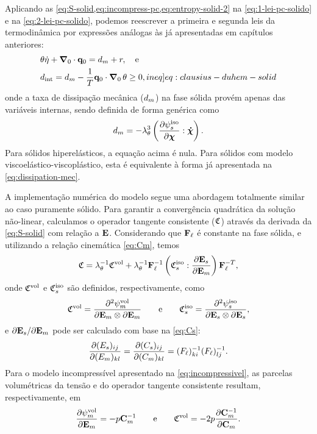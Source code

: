 \documentclass[Tese.tex]{subfiles}
\begin{document}
Aplicando as \cref{eq:S-solid,eq:incompress-pc,eq:entropy-solid-2} na \cref{eq:1-lei-pc-solido} e na \cref{eq:2-lei-pc-solido}, podemos reescrever a primeira e segunda leis da termodinâmica por expressões análogas às já apresentadas em capítulos anteriores:
\begin{align} 
&\temp \dotentropy + \gradientei\cdot\qi = \dissipationmec + \calorInt, \text{\quad e}\label{eq:primeira-lei-solid} \\
&\dissipation = \dissipationmec - \dfrac{1}{T}\qi\cdot\gradientei\,\temp \geq 0,  \label[ineq]{eq:clausius-duhem-solid}
\end{align}
onde a taxa de dissipação mecânica ($d_{m}$) na fase sólida provém apenas das variáveis internas, sendo definida de forma genérica como
\begin{equation} \label{eq:dissipation-solido}
d_{m} = -\lambda_{\theta}^3\left(\dfrac{\partial\psi_s^\text{iso}}{\partial\boldsymbol{\chi}}:\boldsymbol{\dot{\chi}}\right).
\end{equation}
Para sólidos hiperelásticos, a equação acima é nula. Para sólidos com modelo viscoelástico-viscoplástico, esta é equivalente à forma já apresentada na \cref{eq:dissipation-mec}.

A implementação numérica do modelo segue uma abordagem totalmente similar ao caso puramente sólido. Para garantir a convergência quadrática da solução não-linear, calculamos o operador tangente consistente ($\mathfrak{C}$) através da derivada da \cref{eq:S-solid} com relação a $\mathbf{E}$. Considerando que $\mathbf{F}_\ell$ é constante na fase sólida, e utilizando a relação cinemática \eqref{eq:Cm}, temos
\begin{equation}\label{eq:CC-solido}
\mathfrak{C} = \lambda_{\theta}^{-1}\mathfrak{C}^\text{vol} + \lambda_{\theta}^{-1}\mathbf{F}_\ell^{-1}\left(\mathfrak{C}_s^\text{iso}:\dfrac{\partial\mathbf{E}_s}{\partial\mathbf{E}_m}\right)\mathbf{F}_\ell^{-T},
\end{equation}
onde $\mathfrak{C}^\text{vol}$ e $\mathfrak{C}_s^\text{iso}$ são definidos, respectivamente, como
\begin{equation}
\mathfrak{C}^\text{vol} = \dfrac{\partial^2\psi_m^\text{vol}}{\partial\mathbf{E}_m\otimes\partial\mathbf{E}_m} \text{\qquad e\qquad} \mathfrak{C}_s^\text{iso} = \dfrac{\partial^2\psi_s^\text{iso}}{\partial\mathbf{E}_s\otimes\partial\mathbf{E}_s}, \label{eq:CCaux-solido}
\end{equation}
e $\partial\mathbf{E}_s/\partial\mathbf{E}_m$ pode ser calculado com base na \cref{eq:Cs}:
\begin{equation}
\dfrac{\partial({E}_s)_{ij}}{\partial({E}_m)_{kl}} = \dfrac{\partial(C_s)_{ij}}{\partial(C_m)_{kl}} = (F_\ell)^{-1}_{ki}(F_\ell)^{-1}_{lj}. \label{eq:dEs_dEm}
\end{equation}
Para o modelo incompressível apresentado na \cref{eq:incompressivel}, as parcelas volumétricas da tensão e do operador tangente consistente resultam, respectivamente, em
\begin{equation}
\dfrac{\partial\psi_m^\text{vol}}{\partial\mathbf{E}_m} = -p\mathbf{C}_m^{-1} \text{\qquad e\qquad} \mathfrak{C}^\text{vol} =  -2p\dfrac{\partial\mathbf{C}_m^{-1}}{\partial\mathbf{C}_m}.
\end{equation}
\end{document}
